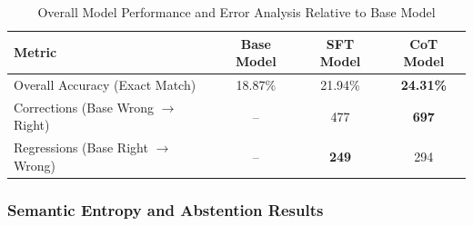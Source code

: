 \documentclass{article}
\begin{document}

\begin{table}[h]
\centering
\caption{Overall Model Performance and Error Analysis Relative to Base Model}
\label{tab:model_performance}
\begin{tabular}{lccc}
\toprule
\textbf{Metric} & \textbf{Base Model} & \textbf{SFT Model} & \textbf{CoT Model} \\
\midrule
Overall Accuracy (Exact Match) & 18.87\% & 21.94\% & \textbf{24.31\%} \\
Corrections (Base Wrong $\to$ Right) & -- & 477 & \textbf{697} \\
Regressions (Base Right $\to$ Wrong) & -- & \textbf{249} & 294 \\
\bottomrule
\end{tabular}
\end{table}

\subsubsection{Semantic Entropy and Abstention Results}
\end{document}

